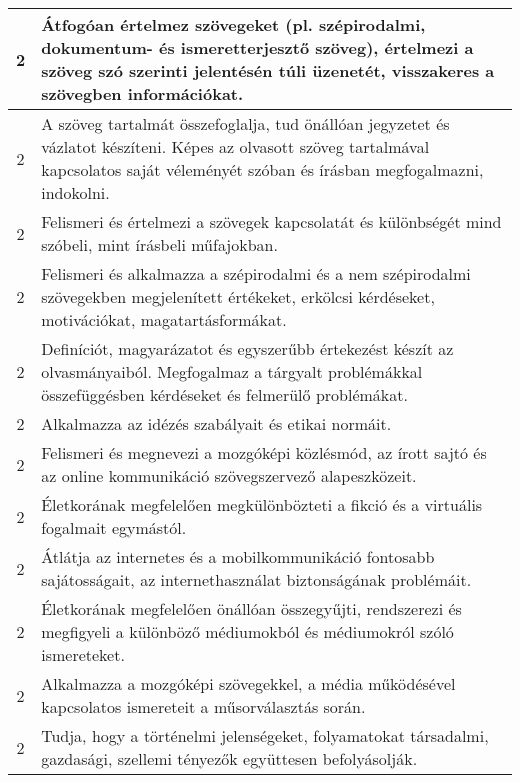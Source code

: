 \begin{longtable}{c | p{12cm} }
                                
                                          2 &  Átfogóan értelmez szövegeket (pl. szépirodalmi, dokumentum- és ismeretterjesztő szöveg), értelmezi a szöveg szó szerinti jelentésén túli üzenetét, visszakeres a szövegben információkat. \\ \hline
                                          2 &  A szöveg tartalmát összefoglalja, tud önállóan jegyzetet és vázlatot készíteni. Képes az olvasott szöveg tartalmával kapcsolatos saját véleményét szóban és írásban megfogalmazni, indokolni. \\ \hline
                                          2 &  Felismeri és értelmezi a szövegek kapcsolatát és különbségét mind szóbeli, mint írásbeli műfajokban. \\ \hline
                                          2 &  Felismeri és alkalmazza a szépirodalmi és a nem szépirodalmi szövegekben megjelenített értékeket, erkölcsi kérdéseket, motivációkat, magatartásformákat. \\ \hline
                                          2 &  Definíciót, magyarázatot és egyszerűbb értekezést készít az olvasmányaiból. Megfogalmaz a tárgyalt problémákkal összefüggésben kérdéseket és felmerülő problémákat. \\ \hline
                                          2 &  Alkalmazza az idézés szabályait és etikai normáit. \\ \hline
                                          2 &  Felismeri és megnevezi a mozgóképi közlésmód, az írott sajtó és az online kommunikáció szövegszervező alapeszközeit. \\ \hline
                                          2 &  Életkorának megfelelően megkülönbözteti a fikció és a virtuális fogalmait egymástól.  \\ \hline
                                          2 &  Átlátja az internetes és a mobilkommunikáció fontosabb sajátosságait, az internethasználat biztonságának problémáit. \\ \hline
                                          2 &  Életkorának megfelelően önállóan összegyűjti, rendszerezi és megfigyeli a különböző  médiumokból és médiumokról szóló ismereteket. \\ \hline
                                          2 &  Alkalmazza a mozgóképi szövegekkel, a média működésével kapcsolatos ismereteit a műsorválasztás során.  \\ \hline
                                          2 &  Tudja, hogy a történelmi jelenségeket, folyamatokat társadalmi, gazdasági, szellemi tényezők együttesen befolyásolják. \\ \hline

\end{longtable}
